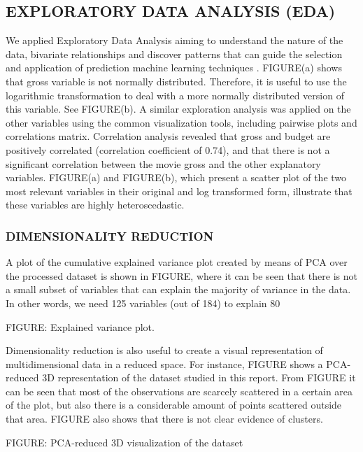 \subsection{EXPLORATORY DATA ANALYSIS (EDA)}
We applied Exploratory Data Analysis aiming to understand the nature of the data, bivariate relationships and discover patterns that can guide the selection and application of prediction machine learning techniques \cite{behrens1997principles}. FIGURE(a) shows that gross variable is not normally distributed. Therefore, it is useful to use the logarithmic transformation to deal with a more normally distributed version of this variable. See FIGURE(b). A similar exploration analysis was applied on the other variables using the common visualization tools, including pairwise plots and correlations matrix. Correlation analysis revealed that gross and budget are positively correlated (correlation coefficient of 0.74), and that there is not a significant correlation between the movie gross and the other explanatory variables. FIGURE(a) and FIGURE(b), which present a scatter plot of the two most relevant variables in their original and log transformed form, illustrate that these variables are highly heteroscedastic. 

\subsubsection{DIMENSIONALITY REDUCTION}
A plot of the cumulative explained variance plot created by means of PCA over the processed dataset is shown in FIGURE, where it can be seen that there is not a small subset of variables that can explain the majority of variance in the data. In other words, we need 125 variables (out of 184) to explain 80%

FIGURE: Explained variance plot.

Dimensionality reduction is also useful to create a visual representation of multidimensional data in a reduced space. For instance, FIGURE shows a PCA-reduced 3D representation of the dataset studied in this report. From FIGURE it can be seen that most of the observations are scarcely scattered in a certain area of the plot, but also there is a considerable amount of points scattered outside that area. FIGURE also shows that there is not clear evidence of clusters. 

FIGURE: PCA-reduced 3D visualization of the dataset

